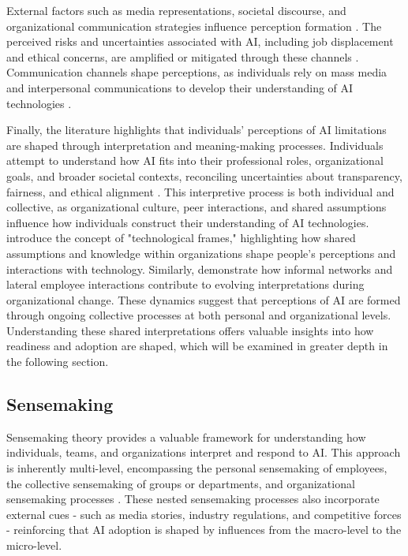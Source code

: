 External factors such as media representations, societal discourse, and organizational communication strategies influence perception formation \citep{Agarwal1998,Trenerry2021}. The perceived risks and uncertainties associated with AI, including job displacement and ethical concerns, are amplified or mitigated through these channels \citep{FakhrHosseini2024,Sadeck2022}. Communication channels shape perceptions, as individuals rely on mass media and interpersonal communications to develop their understanding of AI technologies \citep{Agarwal1998}.

Finally, the literature highlights that individuals' perceptions of AI limitations are shaped through interpretation and meaning-making processes. Individuals attempt to understand how AI fits into their professional roles, organizational goals, and broader societal contexts, reconciling uncertainties about transparency, fairness, and ethical alignment \citep{Maitlis2014,Yin2024}. This interpretive process is both individual and collective, as organizational culture, peer interactions, and shared assumptions influence how individuals construct their understanding of AI technologies. \cite{Orlikowski1994} introduce the concept of "technological frames," highlighting how shared assumptions and knowledge within organizations shape people's perceptions and interactions with technology. Similarly, \cite{Balogun2005} demonstrate how informal networks and lateral employee interactions contribute to evolving interpretations during organizational change. These dynamics suggest that perceptions of AI are formed through ongoing collective processes at both personal and organizational levels. Understanding these shared interpretations offers valuable insights into how readiness and adoption are shaped, which will be examined in greater depth in the following section.

\vspace{-3mm}
\subsection{Sensemaking}

Sensemaking theory provides a valuable framework for understanding how individuals, teams, and organizations interpret and respond to AI. This approach is inherently multi-level, encompassing the personal sensemaking of employees, the collective sensemaking of groups or departments, and organizational sensemaking processes \citep{Maitlis2014,Weick2005}. These nested sensemaking processes also incorporate external cues - such as media stories, industry regulations, and competitive forces - reinforcing that AI adoption is shaped by influences from the macro-level to the micro-level.

